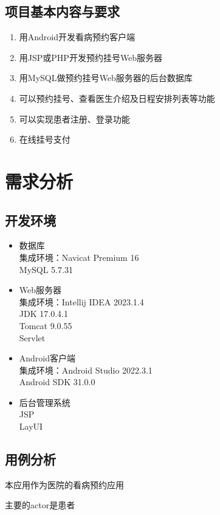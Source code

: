 \documentclass[UTF8,12pt]{article}
\begin{document}
\subsection{项目基本内容与要求}
\begin{enumerate}
    \item 用Android开发看病预约客户端
    \item 用JSP或PHP开发预约挂号Web服务器
    \item 用MySQL做预约挂号Web服务器的后台数据库
    \item 可以预约挂号、查看医生介绍及日程安排列表等功能
    \item 可以实现患者注册、登录功能
    \item 在线挂号支付
\end{enumerate}

\section{需求分析}
\subsection{开发环境}
\begin{itemize}
    \item 数据库
    \\集成环境：Navicat Premium 16
    \\MySQL 5.7.31
    \item Web服务器
    \\集成环境：Intellij IDEA 2023.1.4
    \\JDK 17.0.4.1
    \\Tomcat 9.0.55
    \\Servlet
    \item Android客户端
    \\集成环境：Android Studio 2022.3.1
    \\Android SDK 31.0.0
    \item 后台管理系统
    \\JSP
    \\LayUI
\end{itemize}

\subsection{用例分析}
本应用作为医院的看病预约应用

主要的actor是患者
\end{document}
